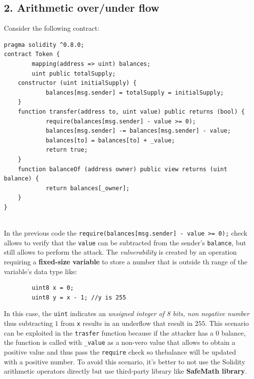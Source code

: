 \documentclass[10pt,a4paper]{report}
\begin{document}
\subsection{2. Arithmetic over/under flow}\label{sec:2-arithmetic-overunder-flow}
Consider the following contract:
\begin{lstlisting}
pragma solidity ^0.8.0; 
contract Token { 
		mapping(address => uint) balances; 
		uint public totalSupply; 
	constructor (uint initialSupply) {
			balances[msg.sender] = totalSupply = initialSupply; 
	} 
	function transfer(address to, uint value) public returns (bool) { 
			require(balances[msg.sender] - value >= 0);
			balances[msg.sender] -= balances[msg.sender] - value; 
			balances[to] = balances[to] + _value;
			return true; 
	} 
	function balanceOf (address owner) public view returns (uint balance) { 
			return balances[_owner];
	} 
}
	
\end{lstlisting}

In the previous code the \texttt{require(balances[msg.sender] - value >= 0);} check allows to verify that the \texttt{value} can be subtracted from the sender's \texttt{balance}, but still allows to perform the attack.
The \textit{vulnerability} is created by an operation requiring a \textbf{fixed-size variable} to store a number that is outside th range of the variable's data type like:
\begin{lstlisting}
		uint8 x = 0;
		uint8 y = x - 1; //y is 255
\end{lstlisting}

In this case, the \texttt{uint} indicates an \textit{unsigned integer of 8 bits, non negative number} thus subtracting $1$ from \texttt{x} results in an underflow that result in $255$.
This scenario can be exploited in the \texttt{trasfer} function because if the attacker has a $0$ balance, the function is called with \texttt{\_value} as a non-vero value that allows to obtain a positive value and thus pass the \texttt{require} check so thebalance will be updated with a positive number.
To avoid this scenario, it's better to not use the Solidity arithmetic operators directly but use third-party library like \textbf{SafeMath library}.
\end{document}
